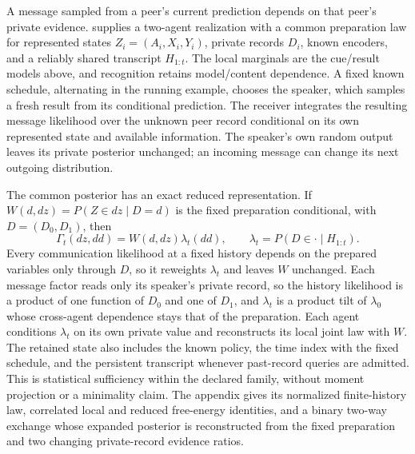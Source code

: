 A message sampled from a peer's current prediction depends on that peer's private evidence.  supplies a two-agent realization with a common preparation law for represented states $Z_i=(A_i,X_i,Y_i)$, private records $D_i$, known encoders, and a reliably shared transcript $H_{1:t}$. The local marginals are the cue/result models above, and recognition retains model/content dependence. A fixed known schedule, alternating in the running example, chooses the speaker, which samples a fresh result from its conditional prediction. The receiver integrates the resulting message likelihood over the unknown peer record conditional on its own represented state and available information. The speaker's own random output leaves its private posterior unchanged; an incoming message can change its next outgoing distribution.

The common posterior has an exact reduced representation. If $W(d,dz)=P(Z\in dz\mid D=d)$ is the fixed preparation conditional, with $D=(D_0,D_1)$, then
\begin{equation}
\Gamma_t(dz,dd)=W(d,dz)\lambda_t(dd),\qquad
\lambda_t=P(D\in\cdot\mid H_{1:t}).
\label{eq:interacting-prediction-retention}
\end{equation}
Every communication likelihood at a fixed history depends on the prepared variables only through $D$, so it reweights $\lambda_t$ and leaves $W$ unchanged. Each message factor reads only its speaker's private record, so the history likelihood is a product of one function of $D_0$ and one of $D_1$, and $\lambda_t$ is a product tilt of $\lambda_0$ whose cross-agent dependence stays that of the preparation. Each agent conditions $\lambda_t$ on its own private value and reconstructs its local joint law with $W$. The retained state also includes the known policy, the time index with the fixed schedule, and the persistent transcript whenever past-record queries are admitted. This is statistical sufficiency within the declared family, without moment projection or a minimality claim. The appendix gives its normalized finite-history law, correlated local and reduced free-energy identities, and a binary two-way exchange whose expanded posterior is reconstructed from the fixed preparation and two changing private-record evidence ratios.

